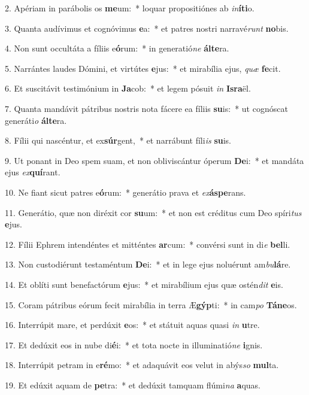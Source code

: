 2. Apériam in parábolis os \textbf{me}um:~*  loquar propositiónes ab \textit{in}\textbf{í}\textbf{ti}o.\

3. Quanta audívimus et cognóvimus \textbf{e}a:~*  et patres nostri narravé\textit{runt} \textbf{no}bis.\

4. Non sunt occultáta a fíliis e\textbf{ó}rum:~*  in generatió\textit{ne} \textbf{ál}\textbf{te}ra.\

5. Narrántes laudes Dómini, et virtútes \textbf{e}jus:~*  et mirabília ejus, \textit{quæ} \textbf{fe}cit.\

6. Et suscitávit testimónium in \textbf{Ja}cob:~*  et legem pósuit \textit{in} \textbf{Is}\textbf{ra}ël.\

7. Quanta mandávit pátribus nostris nota fácere ea fíliis \textbf{su}is:~*  ut cognóscat generáti\textit{o} \textbf{ál}\textbf{te}ra.\

8. Fílii qui nascéntur, et ex\textbf{súr}gent,~*  et narrábunt fíli\textit{is} \textbf{su}is.\

9. Ut ponant in Deo spem suam, et non obliviscántur óperum \textbf{De}i:~*  et mandáta ejus \textit{ex}\textbf{quí}rant.\

10. Ne fiant sicut patres e\textbf{ó}rum:~*  generátio prava et \textit{ex}\textbf{ás}\textbf{pe}rans.\

11. Generátio, quæ non diréxit cor \textbf{su}um:~*  et non est créditus cum Deo spíri\textit{tus} \textbf{e}jus.\

12. Fílii Ephrem intendéntes et mitténtes \textbf{ar}cum:~*  convérsi sunt in di\textit{e} \textbf{bel}li.\

13. Non custodiérunt testaméntum \textbf{De}i:~*  et in lege ejus noluérunt am\textit{bu}\textbf{lá}re.\

14. Et oblíti sunt benefactórum \textbf{e}jus:~*  et mirabílium ejus quæ ostén\textit{dit} \textbf{e}is.\

15. Coram pátribus eórum fecit mirabília in terra Æ\textbf{gýp}ti:~*  in cam\textit{po} \textbf{Tá}\textbf{ne}os.\

16. Interrúpit mare, et perdúxit \textbf{e}os:~*  et státuit aquas quasi \textit{in} \textbf{u}tre.\

17. Et dedúxit eos in nube di\textbf{é}i:~*  et tota nocte in illuminatió\textit{ne} \textbf{i}gnis.\

18. Interrúpit petram in e\textbf{ré}mo:~*  et adaquávit eos velut in abýs\textit{so} \textbf{mul}ta.\

19. Et edúxit aquam de \textbf{pe}tra:~*  et dedúxit tamquam flúmi\textit{na} \textbf{a}quas.\

